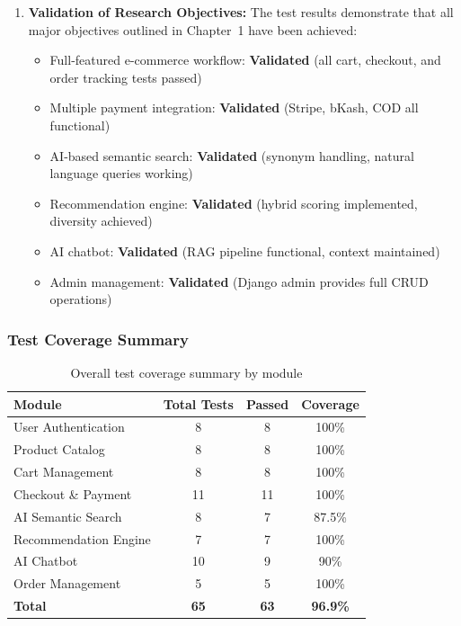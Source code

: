\begin{enumerate}[label=\roman*.]
  \item \textbf{Validation of Research Objectives:} The test results demonstrate that all major objectives outlined in Chapter~1 have been achieved:
  \begin{itemize}
    \item Full-featured e-commerce workflow: \textbf{Validated} (all cart, checkout, and order tracking tests passed)
    \item Multiple payment integration: \textbf{Validated} (Stripe, bKash, COD all functional)
    \item AI-based semantic search: \textbf{Validated} (synonym handling, natural language queries working)
    \item Recommendation engine: \textbf{Validated} (hybrid scoring implemented, diversity achieved)
    \item AI chatbot: \textbf{Validated} (RAG pipeline functional, context maintained)
    \item Admin management: \textbf{Validated} (Django admin provides full CRUD operations)
  \end{itemize}
\end{enumerate}

\subsubsection*{Test Coverage Summary}

\begin{table}[H]
\centering
\caption{Overall test coverage summary by module}
\begin{tabular}{|l|c|c|c|}
\hline
\textbf{Module} & \textbf{Total Tests} & \textbf{Passed} & \textbf{Coverage} \\
\hline
User Authentication & 8 & 8 & 100\% \\
Product Catalog & 8 & 8 & 100\% \\
Cart Management & 8 & 8 & 100\% \\
Checkout \& Payment & 11 & 11 & 100\% \\
AI Semantic Search & 8 & 7 & 87.5\% \\
Recommendation Engine & 7 & 7 & 100\% \\
AI Chatbot & 10 & 9 & 90\% \\
Order Management & 5 & 5 & 100\% \\
\hline
\textbf{Total} & \textbf{65} & \textbf{63} & \textbf{96.9\%} \\
\hline
\end{tabular}
\end{table}

